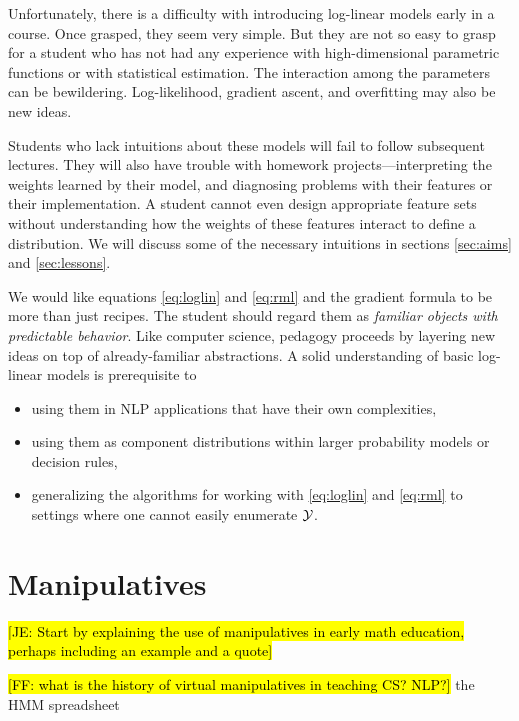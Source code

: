 \documentclass[11pt,letterpaper]{article}
\newcommand{\Note}[1]{}
\renewcommand{\Note}[1]{\hl{[#1]}}
\newcommand{\NoteSigned}[3]{{\sethlcolor{#2}\Note{#1: #3}}}
\newcommand{\NoteFF}[1]{\NoteSigned{FF}{LightBlue}{#1}}
\newcommand{\NoteJE}[1]{\NoteSigned{JE}{LightGreen}{#1}}
\begin{document}
Unfortunately, there is a difficulty with introducing log-linear
models early in a course.  Once grasped, they seem very simple.  But
they are not so easy to grasp for a student who has not had any
experience with high-dimensional parametric functions or with
statistical estimation.  The interaction among the parameters can be
bewildering.  Log-likelihood, gradient ascent, and overfitting may also
be new ideas.

Students who lack intuitions about these models will fail to follow
subsequent lectures.  They will also have trouble with homework
projects---interpreting the weights learned by their model, and
diagnosing problems with their features or their implementation.  A
student cannot even design appropriate feature sets without
understanding how the weights of these features interact to define a
distribution.  We will discuss some of the necessary intuitions in
sections \ref{sec:aims} and \ref{sec:lessons}.

We would like equations \eqref{eq:loglin} and \eqref{eq:rml} and the
gradient formula to be more than just recipes.  The student should
regard them as {\em familiar objects with predictable behavior}.  Like
computer science, pedagogy proceeds by layering new ideas on top of
already-familiar abstractions.  A solid understanding of basic
log-linear models is prerequisite to 
\begin{itemize}
\item using them in NLP applications that have their own complexities, 
\item using them as component distributions within larger probability
  models or decision rules,
\item generalizing the algorithms for working with \eqref{eq:loglin}
  and \eqref{eq:rml} to settings where one cannot easily enumerate
  ${\cal Y}$.
\end{itemize}

\section{Manipulatives}

\NoteJE{Start by explaining the use of manipulatives in early math
  education, perhaps including an example and a quote}

\NoteFF{what is the history of virtual manipulatives in teaching CS? NLP?} the HMM spreadsheet \cite{eisner-2002-tnlp}

\end{document}
